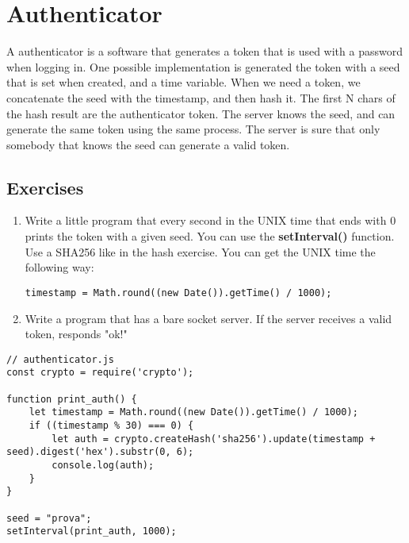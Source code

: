 \section{Authenticator}
A authenticator is a software that generates a token that is used with a password when logging in. One possible implementation is generated the token with a seed that is set when created, and a time variable. When we need a token, we concatenate the seed with the timestamp, and then hash it. The first N chars of the hash result are the authenticator token. The server knows the seed, and can generate the same token using the same process. The server is sure that only somebody that knows the seed can generate a valid token.

\subsection{Exercises}
\begin{enumerate}
	\item Write a little program that every second in the UNIX time that ends with 0 prints the token with a given seed. You can use the \textbf{setInterval()} function. Use a SHA256 like in the hash exercise. You can get the UNIX time the following way:
	\begin{lstlisting}[style=JavaScript]
	timestamp = Math.round((new Date()).getTime() / 1000);
	\end{lstlisting}
	\item Write a program that has a bare socket server. 
	If the server receives a valid token, responds "ok!" 
\end{enumerate}

\begin{lstlisting}[style=JavaScript]
// authenticator.js
const crypto = require('crypto');

function print_auth() {
    let timestamp = Math.round((new Date()).getTime() / 1000);
    if ((timestamp % 30) === 0) {
        let auth = crypto.createHash('sha256').update(timestamp + seed).digest('hex').substr(0, 6);
        console.log(auth);
    }
}

seed = "prova";
setInterval(print_auth, 1000);
\end{lstlisting}


